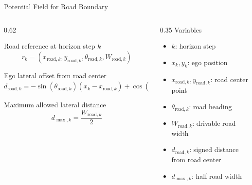 \documentclass[aspectratio=169]{beamer}
\begin{document}
\begin{frame}{Potential Field for Road Boundary}
\small
\begin{columns}[T,onlytextwidth]
\begin{column}{0.62\textwidth}
\begin{flushleft}
Road reference at horizon step $k$
\[
r_k =
\left(
x_{\mathrm{road},k},
y_{\mathrm{road},k},
\theta_{\mathrm{road},k},
W_{\mathrm{road},k}
\right)
\]

Ego lateral offset from road center
\[
d_{\mathrm{road},k}
=
-\sin(\theta_{\mathrm{road},k})(x_k-x_{\mathrm{road},k})
+
\cos(\theta_{\mathrm{road},k})(y_k-y_{\mathrm{road},k})
\]

Maximum allowed lateral distance
\[
d_{\max,k}
=
\frac{W_{\mathrm{road},k}}{2}
\]
\end{flushleft}
\end{column}

\begin{column}{0.35\textwidth}
Variables
\begin{itemize}
\setlength\itemsep{0.3em}
\item $k$: horizon step
\item $x_k,y_k$: ego position
\item $x_{\mathrm{road},k},y_{\mathrm{road},k}$: road center point
\item $\theta_{\mathrm{road},k}$: road heading
\item $W_{\mathrm{road},k}$: drivable road width
\item $d_{\mathrm{road},k}$: signed distance from road center
\item $d_{\max,k}$: half road width
\end{itemize}
\end{column}
\end{columns}
\end{frame}
\end{document}
